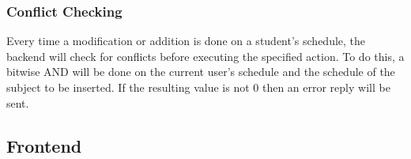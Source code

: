 \documentclass{sigchi}
\begin{document}
\subsubsection{Conflict Checking}

Every time a modification or addition is done on a student's schedule, the 
backend will check for conflicts before executing the specified action. 
To do this, a bitwise AND will be done on the current user's schedule and the
schedule of the subject to be inserted. If the resulting value is not 0 then
an error reply will be sent.


\subsection{Frontend}




% 
% 

\cleardoublepage
\end{document}
